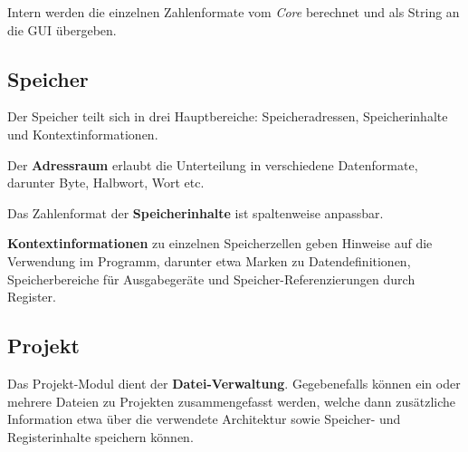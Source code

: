 \documentclass{article}
\begin{document}
            Intern werden die einzelnen Zahlenformate vom \textit{Core} berechnet und als String an die GUI übergeben.
        
        \subsection{Speicher}
        
            Der Speicher teilt sich in drei Hauptbereiche: Speicheradressen, Speicherinhalte und Kontextinformationen.
            
            Der \textbf{Adressraum} erlaubt die Unterteilung in verschiedene Datenformate, darunter Byte, Halbwort, Wort etc.
            
            Das Zahlenformat der \textbf{Speicherinhalte} ist spaltenweise anpassbar.
            
            \textbf{Kontextinformationen} zu einzelnen Speicherzellen geben Hinweise auf die Verwendung im Programm, darunter etwa Marken zu Datendefinitionen, Speicherbereiche für Ausgabegeräte und Speicher-Referenzierungen durch Register.
        
        \subsection{Projekt}
        
            Das Projekt-Modul dient der \textbf{Datei-Verwaltung}. Gegebenefalls können ein oder mehrere Dateien zu Projekten zusammengefasst werden, welche dann zusätzliche Information etwa über die verwendete Architektur sowie Speicher- und Registerinhalte speichern können.
    
\end{document}
